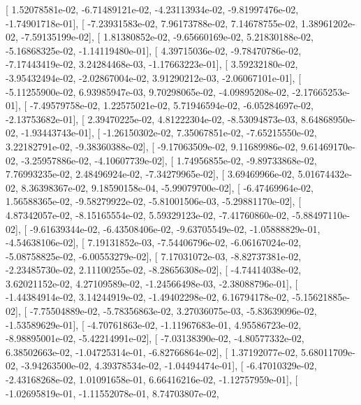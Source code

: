 \documentclass{article}
\begin{document}
       [  1.52078581e-02,  -6.71489121e-02,  -4.23113934e-02,
         -9.81997476e-02,  -1.74901718e-01],
       [ -7.23931583e-02,   7.96173788e-02,   7.14678755e-02,
          1.38961202e-02,  -7.59135199e-02],
       [  1.81380852e-02,  -9.65660169e-02,   5.21830188e-02,
         -5.16868325e-02,  -1.14119480e-01],
       [  4.39715036e-02,  -9.78470786e-02,  -7.17443419e-02,
          3.24284468e-03,  -1.17663223e-01],
       [  3.59232180e-02,  -3.95432494e-02,  -2.02867004e-02,
          3.91290212e-03,  -2.06067101e-01],
       [ -5.11255900e-02,   6.93985947e-03,   9.70298065e-02,
         -4.09895208e-02,  -2.17665253e-01],
       [ -7.49579758e-02,   1.22575021e-02,   5.71946594e-02,
         -6.05284697e-02,  -2.13753682e-01],
       [  2.39470225e-02,   4.81222304e-02,  -8.53094873e-03,
          8.64868950e-02,  -1.93443743e-01],
       [ -1.26150302e-02,   7.35067851e-02,  -7.65215550e-02,
          3.22182791e-02,  -9.38360388e-02],
       [ -9.17063509e-02,   9.11689986e-02,   9.61469170e-02,
         -3.25957886e-02,  -4.10607739e-02],
       [  1.74956855e-02,  -9.89733868e-02,   7.76993235e-02,
          2.48496924e-02,  -7.34279965e-02],
       [  3.69469966e-02,   5.01674432e-02,   8.36398367e-02,
          9.18590158e-04,  -5.99079700e-02],
       [ -6.47469964e-02,   1.56588365e-02,  -9.58279922e-02,
         -5.81001506e-03,  -5.29881170e-02],
       [  4.87342057e-02,  -8.15165554e-02,   5.59329123e-02,
         -7.41760860e-02,  -5.88497110e-02],
       [ -9.61639344e-02,  -6.43508406e-02,  -9.63705549e-02,
         -1.05888829e-01,  -4.54638106e-02],
       [  7.19131852e-03,  -7.54406796e-02,  -6.06167024e-02,
         -5.08758825e-02,  -6.00553279e-02],
       [  7.17031072e-03,  -8.82737381e-02,  -2.23485730e-02,
          2.11100255e-02,  -8.28656308e-02],
       [ -4.74414038e-02,   3.62021152e-02,   4.27109589e-02,
         -1.24566498e-03,  -2.38088796e-01],
       [ -1.44384914e-02,   3.14244919e-02,  -1.49402298e-02,
          6.16794178e-02,  -5.15621885e-02],
       [ -7.75504889e-02,  -5.78356863e-02,   3.27036075e-03,
         -5.83639096e-02,  -1.53589629e-01],
       [ -4.70761863e-02,  -1.11967683e-01,   4.95586723e-02,
         -8.98895001e-02,  -5.42214991e-02],
       [ -7.03138390e-02,  -4.80577332e-02,   6.38502663e-02,
         -1.04725314e-01,  -6.82766864e-02],
       [  1.37192077e-02,   5.68011709e-02,  -3.94263500e-02,
          4.39378534e-02,  -1.04494474e-01],
       [ -6.47010329e-02,  -2.43168268e-02,   1.01091658e-01,
          6.66416216e-02,  -1.12757959e-01],
       [ -1.02695819e-01,  -1.11552078e-01,   8.74703807e-02,
\end{document}
